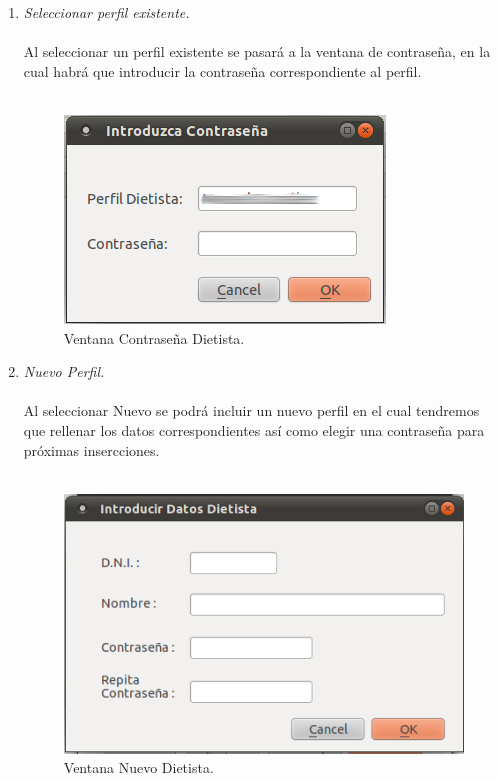\begin{enumerate}
\begin{enumerate}
\item \textit{Seleccionar perfil existente.}\\\\
Al seleccionar un perfil existente se pasará a la ventana de contraseña, en la cual habrá que introducir la contraseña correspondiente al perfil.\\\\
\begin{figure}[H]
  \label{dietista_psswd}
  \begin{center}
    \includegraphics[scale=0.5]{../../Image/dietista-passwd.png}
  \end{center}
  \caption{Ventana Contraseña Dietista.}
\end{figure}

\item \textit{Nuevo Perfil.}\\\\
Al seleccionar Nuevo se podrá incluir un nuevo perfil en el cual tendremos que rellenar los datos correspondientes así como elegir una contraseña para próximas insercciones.\\\\
\begin{figure}[H]
  \label{nuevo_dietista}
  \begin{center}
    \includegraphics[scale=0.5]{../../Image/dietista-datos.png}
  \end{center}
  \caption{Ventana Nuevo Dietista.}
\end{figure}


\end{enumerate}
\end{enumerate}
